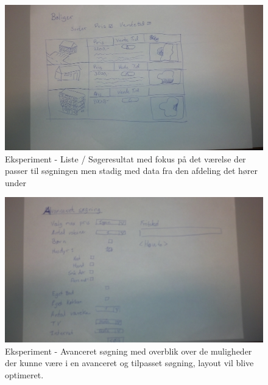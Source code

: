 \documentclass[12pt, a4paper]{report}
\begin{document}
\begin{figure}[ht]
\includegraphics[scale=0.14]{eksperiment_liste}
\caption{Eksperiment - Liste / Søgeresultat med fokus på det værelse der passer til søgningen men stadig med data fra den afdeling det hører under}
\label{e_liste}
\end{figure}

\begin{figure}[ht]
\includegraphics[scale=0.14]{eksperiment_soeg}
\caption{Eksperiment - Avanceret søgning med overblik over de muligheder der kunne være i en avanceret og tilpasset søgning, layout vil blive optimeret.}
\label{e_soeg}
\end{figure}
\end{document}
